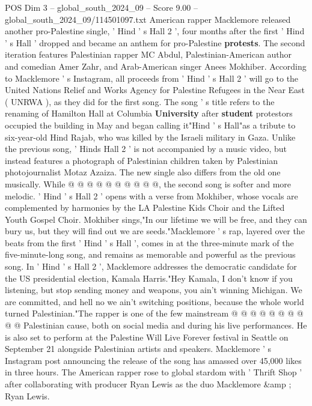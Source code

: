 \begin{textsample}{POS Dim 3 – global\_south\_2024\_09 – Score 9.00 – global\_south\_2024\_09/114501097.txt}  \label{ex:f3_pos_331}
American rapper Macklemore released another pro-Palestine single, ' Hind ' s Hall 2 ', four months after the first ' Hind ' s Hall ' dropped and became an anthem for pro-Palestine \textbf{protests}.
The second iteration features Palestinian rapper MC Abdul, Palestinian-American author and comedian Amer Zahr, and Arab-American singer Anees Mokhiber.
According to Macklemore ' s Instagram, all proceeds from ' Hind ' s Hall 2 ' will go to the United Nations Relief and Works Agency for Palestine Refugees in the Near East ( UNRWA ), as they did for the first song.
The song ' s title refers to the renaming of Hamilton Hall at Columbia \textbf{University} after \textbf{student} protestors occupied the building in May and began calling it"Hind ' s Hall"as a tribute to six-year-old Hind Rajab, who was killed by the Israeli military in Gaza.
Unlike the previous song, ' Hinds Hall 2 ' is not accompanied by a music video, but instead features a photograph of Palestinian children taken by Palestinian photojournalist Motaz Azaiza.
The new single also differs from the old one musically.
While @ @ @ @ @ @ @ @ @ @, the second song is softer and more melodic. ' Hind ' s Hall 2 ' opens with a verse from Mokhiber, whose vocals are complemented by harmonies by the LA Palestine Kids Choir and the Lifted Youth Gospel Choir.
Mokhiber sings,"In our lifetime we will be free, and they can bury us, but they will find out we are seeds."Macklemore ' s rap, layered over the beats from the first ' Hind ' s Hall ', comes in at the three-minute mark of the five-minute-long song, and remains as memorable and powerful as the previous song.
In ' Hind ' s Hall 2 ', Macklemore addresses the democratic candidate for the US presidential election, Kamala Harris."Hey Kamala, I don't know if you listening, but stop sending money and weapons, you ain't winning Michigan.
We are committed, and hell no we ain't switching positions, because the whole world turned Palestinian."The rapper is one of the few mainstream @ @ @ @ @ @ @ @ @ @ Palestinian cause, both on social media and during his live performances.
He is also set to perform at the Palestine Will Live Forever festival in Seattle on September 21 alongside Palestinian artists and speakers.
Macklemore ' s Instagram post announcing the release of the song has amassed over 45,000 likes in three hours.
The American rapper rose to global stardom with ' Thrift Shop ' after collaborating with producer Ryan Lewis as the duo Macklemore \&amp ; Ryan Lewis.

\end{textsample}
